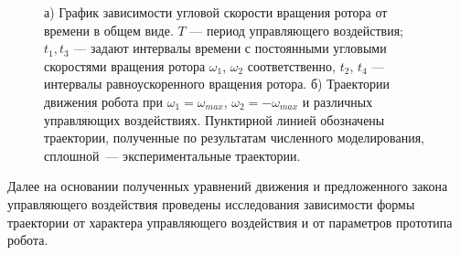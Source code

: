 \begin{figure}[!ht]
	\begin{minipage}[h]{0.3\linewidth}
	\end{minipage}
	\hfill
	\begin{minipage}[h]{0.7\linewidth}
	\end{minipage}
	\vfill
	\begin{minipage}[h]{0.3\linewidth}
	\end{minipage}
	\hfill
	\begin{minipage}[h]{0.7\linewidth}
	\end{minipage}
	\caption{а) График зависимости угловой скорости вращения ротора от времени в общем виде. $T$ --- период управляющего воздействия; $t_1, t_3$ --- задают интервалы времени с постоянными угловыми скоростями вращения ротора $\omega_1$, $\omega_2$ соответственно, $t_2$, $t_4$ --- интервалы равноускоренного вращения ротора. б) Траектории движения робота при  $ \omega_1 = \omega_{max} $, $ \omega_2 = -\omega_{max} $ и различных  управляющих воздействиях. Пунктирной линией обозначены траектории, полученные по результатам численного моделирования, сплошной~--- экспериментальные траектории.}
	\label{ControlAction}
\end{figure}


Далее на основании полученных уравнений движения и предложенного закона управляющего воздействия проведены исследования зависимости формы траектории от характера управляющего воздействия и от параметров прототипа робота. 











